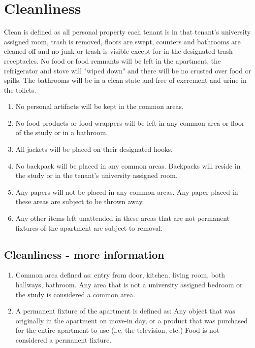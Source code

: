 \documentclass[10pt]{article}
\begin{document}
\section{Cleanliness} \label{Cleanliness}
Clean is defined as all personal property each tenant is in that tenant’s university assigned room, trash is removed, floors are swept, counters and bathrooms are cleaned off and no junk or trash is visible except for in the designated trash receptacles. No food or food remnants will be left in the apartment, the refrigerator and stove will "wiped down" and there will be no crusted over food or spills. The bathrooms will be in a clean state and free of excrement and urine in the toilets.
\begin{enumerate}
	\item No personal artifacts will be kept in the common areas.
	\item No food products or food wrappers will be left in any common area or floor of the study or in a bathroom.
	\item All jackets will be placed on their designated hooks.
	\item No backpack will be placed in any common areas. Backpacks will reside in the study or in the tenant’s university assigned room.
	\item Any papers will not be placed in any common areas. Any paper placed in these areas are subject to be thrown away.
	\item Any other items left unattended in these areas that are not permanent fixtures of the apartment are subject to removal.
	
\end{enumerate}
\subsection{Cleanliness - more information}
\begin{enumerate}
	\item Common area defined as: entry from door, kitchen, living room, both hallways, bathroom. Any area that is not a university assigned bedroom or the study is considered a common area.
	\item A permanent fixture of the apartment is defined as: Any object that was originally in the apartment on move-in day, or a product that was purchased for the entire apartment to use (i.e. the television, etc.)
	\subitem Food is not considered a permanent fixture.
\end{enumerate}
\end{document}
